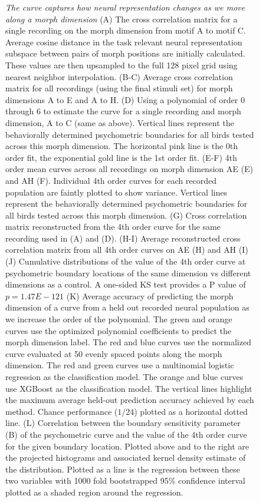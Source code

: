 \begin{figure}[tp]
  \caption[The \Thielk curve captures how neural representation changes as we move along a morph dimension]{
  \emph{The \Thielk curve captures how neural representation changes as we move along a morph dimension}
(A)	The cross correlation matrix for a single recording on the morph dimension from motif A to motif C. Average cosine distance in the task relevant neural representation subspace between pairs of morph positions are initially calculated. These values are then upsampled to the full 128 pixel grid using nearest neighbor interpolation.
(B-C)	Average cross correlation matrix for all recordings (using the final stimuli set) for morph dimensions A to E and A to H.
(D)	Using a polynomial of order 0 through 6 to estimate the \Thielk curve for a single recording and morph dimension, A to C (same as above).
Vertical lines represent the behaviorally determined psychometric boundaries for all birds tested across this morph dimension. The horizontal pink line is the 0th order fit, the exponential gold line is the 1st order fit.
(E-F)	4th order mean \Thielk curves across all recordings on morph dimension AE (E) and AH (F). Individual 4th order \Thielk curves for each recorded population are faintly plotted to show variance. Vertical lines represent the behaviorally determined psychometric boundaries for all birds tested across this morph dimension.
(G)	Cross correlation matrix reconstructed from the 4th order \Thielk curve for the same recording used in (A) and (D).
(H-I)	Average reconstructed cross correlation matrix from all 4th order \Thielk curves on AE (H) and AH (I)
(J)	Cumulative distributions of the value of the 4th order \Thielk curve at psychometric boundary locations of the same dimension vs different dimensions as a control. A one-sided KS test provides a P value of $p=1.47E-121$
(K)	Average accuracy of predicting the morph dimension of a \Thielk curve from a held out recorded neural population as we increase the order of the polynomial. The green and orange curves use the optimized polynomial coefficients to predict the morph dimension label. The red and blue curves use the normalized \Thielk curve evaluated at 50 evenly spaced points along the morph dimension. The red and green curves use a multinomial logistic regression as the classification model. The orange and blue curves use XGBoost as the classification model. The vertical lines highlight the maximum average held-out prediction accuracy achieved by each method. Chance performance ($1/24$) plotted as a horizontal dotted line.
(L)	Correlation between the boundary sensitivity parameter (B) of the psychometric curve and the value of the 4th order \Thielk curve for the given boundary location. Plotted above and to the right are the projected histograms and associated kernel density estimate of the distribution. Plotted as a line is the regression between these two variables with 1000 fold bootstrapped 95\% confidence interval plotted as a shaded region around the regression.
}
\end{figure}

